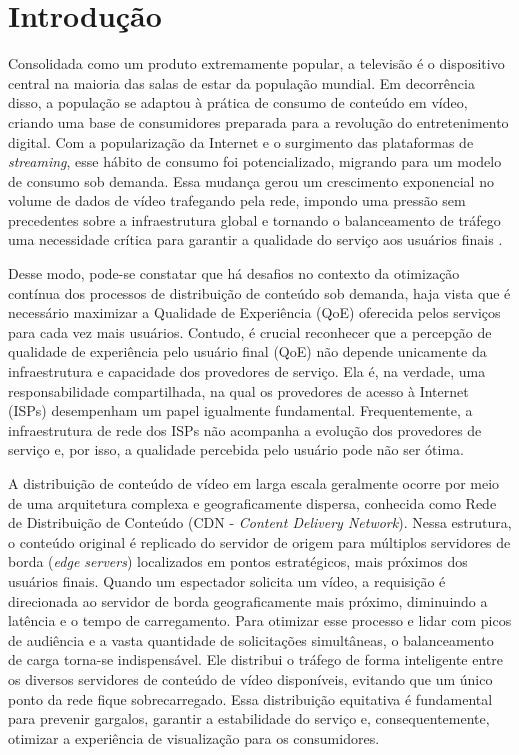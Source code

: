 \chapter{Introdução} \label{cap:Introducao}

Consolidada como um produto extremamente popular, a televisão é o dispositivo central na maioria das salas de estar da população mundial. Em decorrência disso, a população se adaptou à prática de consumo de conteúdo em vídeo, criando uma base de consumidores preparada para a revolução do entretenimento digital. Com a popularização da Internet e o surgimento das plataformas de \textit{streaming}, esse hábito de consumo foi potencializado, migrando para um modelo de consumo sob demanda. Essa mudança gerou um crescimento exponencial no volume de dados de vídeo trafegando pela rede, impondo uma pressão sem precedentes sobre a infraestrutura global e tornando o balanceamento de tráfego uma necessidade crítica para garantir a qualidade do serviço aos usuários finais \cite{cisco2020vni}.

Desse modo, pode-se constatar que há desafios no contexto da otimização contínua dos processos de distribuição de conteúdo sob demanda, haja vista que é necessário maximizar a Qualidade de Experiência (QoE) oferecida pelos serviços para cada vez mais usuários. Contudo, é crucial reconhecer que a percepção de qualidade de experiência pelo usuário final (QoE) não depende unicamente da infraestrutura e capacidade dos provedores de serviço. Ela é, na verdade, uma responsabilidade compartilhada, na qual os provedores de acesso à Internet (ISPs) desempenham um papel igualmente fundamental. Frequentemente, a infraestrutura de rede dos ISPs não acompanha a evolução dos provedores de serviço e, por isso, a qualidade percebida pelo usuário pode não ser ótima. 

A distribuição de conteúdo de vídeo em larga escala geralmente ocorre por meio de uma arquitetura complexa e geograficamente dispersa, conhecida como Rede de Distribuição de Conteúdo (CDN - \textit{Content Delivery Network}). Nessa estrutura, o conteúdo original é replicado do servidor de origem para múltiplos servidores de borda (\textit{edge servers}) localizados em pontos estratégicos, mais próximos dos usuários finais. Quando um espectador solicita um vídeo, a requisição é direcionada ao servidor de borda geograficamente mais próximo, diminuindo a latência e o tempo de carregamento. Para otimizar esse processo e lidar com picos de audiência e a vasta quantidade de solicitações simultâneas, o balanceamento de carga torna-se indispensável. Ele distribui o tráfego de forma inteligente entre os diversos servidores de conteúdo de vídeo disponíveis, evitando que um único ponto da rede fique sobrecarregado. Essa distribuição equitativa é fundamental para prevenir gargalos, garantir a estabilidade do serviço e, consequentemente, otimizar a experiência de visualização para os consumidores.


